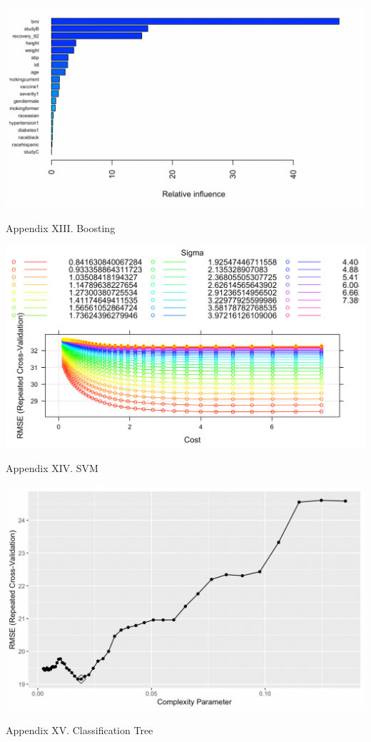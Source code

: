 \documentclass[
]{article}
\begin{document}
\begin{center}\includegraphics[width=0.9\linewidth,height=0.7\textheight]{secondary_analysis_plot/boosting} \end{center}
\begin{center}
Appendix XIII. Boosting
\end{center}

\begin{center}\includegraphics[width=0.9\linewidth,height=0.7\textheight]{secondary_analysis_plot/smv} \end{center}
\begin{center}
Appendix XIV. SVM
\end{center}

\begin{center}\includegraphics[width=0.9\linewidth,height=0.7\textheight]{secondary_analysis_plot/tree1} \end{center}
\begin{center}
Appendix XV. Classification Tree
\end{center}
\end{document}
